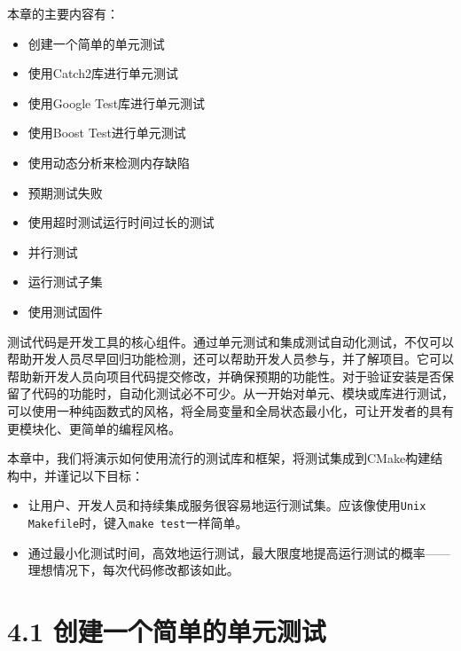 本章的主要内容有：

\begin{itemize}
\item 创建一个简单的单元测试

\item 使用Catch2库进行单元测试

\item 使用Google Test库进行单元测试

\item 使用Boost Test进行单元测试

\item 使用动态分析来检测内存缺陷

\item 预期测试失败

\item 使用超时测试运行时间过长的测试

\item 并行测试

\item 运行测试子集

\item 使用测试固件

\end{itemize}

测试代码是开发工具的核心组件。通过单元测试和集成测试自动化测试，不仅可以帮助开发人员尽早回归功能检测，还可以帮助开发人员参与，并了解项目。它可以帮助新开发人员向项目代码提交修改，并确保预期的功能性。对于验证安装是否保留了代码的功能时，自动化测试必不可少。从一开始对单元、模块或库进行测试，可以使用一种纯函数式的风格，将全局变量和全局状态最小化，可让开发者的具有更模块化、更简单的编程风格。

本章中，我们将演示如何使用流行的测试库和框架，将测试集成到CMake构建结构中，并谨记以下目标：

\begin{itemize}
\item 让用户、开发人员和持续集成服务很容易地运行测试集。应该像使用\texttt{Unix Makefile}时，键入\texttt{make test}一样简单。

\item 通过最小化测试时间，高效地运行测试，最大限度地提高运行测试的概率——理想情况下，每次代码修改都该如此。

\end{itemize}


\section{4.1 创建一个简单的单元测试}

